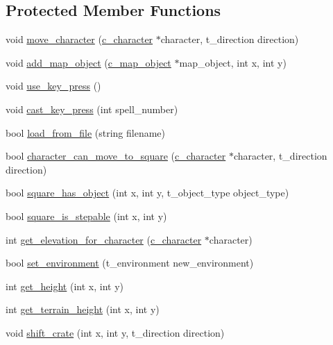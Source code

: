 \subsection*{Protected Member Functions}
\begin{DoxyCompactItemize}
\item 
void \hyperlink{classc__map_a56abddfd11fc1bc9fd9067ad449f21af}{move\-\_\-character} (\hyperlink{classc__character}{c\-\_\-character} $\ast$character, t\-\_\-direction direction)
\item 
void \hyperlink{classc__map_a405354857d0db95dcaf5d4f7371148cb}{add\-\_\-map\-\_\-object} (\hyperlink{classc__map__object}{c\-\_\-map\-\_\-object} $\ast$map\-\_\-object, int x, int y)
\item 
void \hyperlink{classc__map_aeff67cce172a9d464917ccccd03eab47}{use\-\_\-key\-\_\-press} ()
\item 
void \hyperlink{classc__map_a3ea565ef763bd3aaa610d1ab21f72068}{cast\-\_\-key\-\_\-press} (int spell\-\_\-number)
\item 
bool \hyperlink{classc__map_a97ea01c33b55d2e3d1d706f39aa24588}{load\-\_\-from\-\_\-file} (string filename)
\item 
bool \hyperlink{classc__map_a37968729cca9219336b7f31265f3fc40}{character\-\_\-can\-\_\-move\-\_\-to\-\_\-square} (\hyperlink{classc__character}{c\-\_\-character} $\ast$character, t\-\_\-direction direction)
\item 
bool \hyperlink{classc__map_aab9ab7a3336fd65506e5c842a2d217f1}{square\-\_\-has\-\_\-object} (int x, int y, t\-\_\-object\-\_\-type object\-\_\-type)
\item 
bool \hyperlink{classc__map_af4970a07daeff76db0cc32b6b69a93c9}{square\-\_\-is\-\_\-stepable} (int x, int y)
\item 
int \hyperlink{classc__map_a790027eaa0b60bcd2a11801e961a5232}{get\-\_\-elevation\-\_\-for\-\_\-character} (\hyperlink{classc__character}{c\-\_\-character} $\ast$character)
\item 
bool \hyperlink{classc__map_a24ac92070725adc1c295246887df88a1}{set\-\_\-environment} (t\-\_\-environment new\-\_\-environment)
\item 
int \hyperlink{classc__map_a250c11079b911dc753bc5dcb9521813e}{get\-\_\-height} (int x, int y)
\item 
int \hyperlink{classc__map_a273cb97d6d816e839a42460af56152f6}{get\-\_\-terrain\-\_\-height} (int x, int y)
\item 
void \hyperlink{classc__map_af929a9ab4f0d6cd50e58ac8956afa846}{shift\-\_\-crate} (int x, int y, t\-\_\-direction direction)

\end{DoxyCompactItemize}

